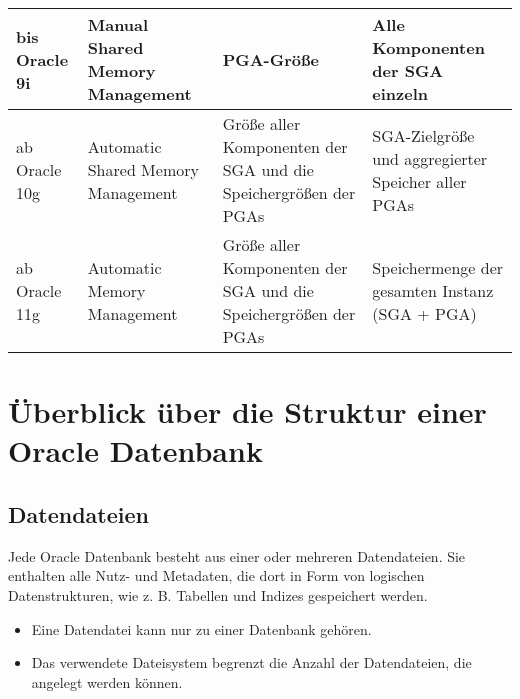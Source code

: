         \begin{center}
          \label{tabmemorymanagement}
          \begin{small}
            \tabletail{
              \hline
            }
            \tablelasttail{
              \hline
            }
            \begin{supertabular}{|p{2.1cm}|p{4.15cm}|p{4.5cm}|p{3.6cm}|}
              bis Oracle 9i & \raggedright Manual Shared Memory Management & PGA-Größe & Alle Komponenten der SGA einzeln \\
              \hline
              ab Oracle 10g & \raggedright Automatic Shared Memory Management & Größe aller Komponenten der SGA und die Speichergrößen der PGAs & SGA-Zielgröße und ag\-gre\-gier\-ter Speicher aller PGAs\\
              \hline
              ab Oracle 11g & \raggedright Automatic Memory Management & Größe aller Komponenten der SGA und die Speichergrößen der PGAs & Speichermenge der gesamten Instanz (SGA + PGA)\\
            \end{supertabular}
          \end{small}
        \end{center}

      \section{Überblick über die Struktur einer Oracle Datenbank}
        \subsection{Datendateien}
          Jede Oracle Datenbank besteht aus einer oder mehreren Datendateien. Sie enthalten alle Nutz- und Metadaten, die dort in Form von logischen Datenstrukturen, wie z. B. Tabellen und Indizes gespeichert werden.

          \begin{merke}
            \begin{itemize}
              \item Eine Datendatei kann nur zu einer Datenbank gehören.
              \item Das verwendete Dateisystem begrenzt die Anzahl der Datendateien, die angelegt werden können.
            \end{itemize}
          \end{merke}
